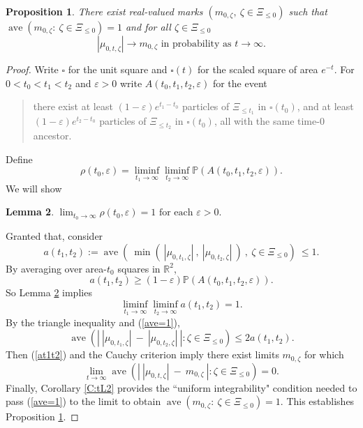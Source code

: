 \documentclass[12pt]{article}
\newtheorem{Lemma}{Lemma}
\newtheorem{Proposition}[Lemma]{Proposition}
\newcommand{\Reals}{{\mathbb{R}}}
\newcommand{\eps}{\varepsilon}
\renewcommand{\Pr}{{\mathbb P}}
\DeclareMathOperator{\ave}{ave}
\begin{document}
\begin{Proposition}
\label{P:couplenew}
There exist real-valued marks 
$(m_{0, \zeta}, \ \zeta \in \Xi_{\le 0})$ such that 
$\ave (m_{0, \zeta} : \ \zeta \in \Xi_{\le 0}) = 1$  and
for all $\zeta \in \Xi_{\le 0}$
\[ | \mu_{0,t,\zeta}| \to m_{0, \zeta} \mbox{ in probability as } t \to \infty.
\]
\end{Proposition}
\begin{proof}
Write $\square$ for the unit square and $\square(t)$ for the scaled square of area $e^{-t}$.
For $0 <t_0 <  t_1 < t_2$  and $\eps > 0$ write $A(t_0, t_1,t_2,\eps)$ for the event
\begin{quote}
there exist at least $(1 - \eps)e^{t_1-t_0}$ particles of $\Xi_{\le t_1}$ in $\square(t_0)$, and 
at least $(1 - \eps)e^{t_2-t_0}$ particles of $\Xi_{\le t_2}$ in $\square(t_0)$, 
all with the same time-$0$ ancestor.
\end{quote}
Define
\begin{equation}
 \rho(t_0, \eps) = \liminf_{t_1 \to \infty} \liminf_{t_2 \to \infty} \Pr(A(t_0,t_1,t_2,\eps)) . 
 \label{reps}
 \end{equation}
We will show
\begin{Lemma}
$\lim_{t_0 \to \infty} \rho(t_0, \eps)  = 1 
\mbox{ for each } \eps > 0 .$
\label{t00}
\end{Lemma}
Granted that, consider
\[
a(t_1,t_2) :=
 \ave( \ \min( \ | \mu_{0,t_1,\zeta}| \ , \ | \mu_{0,t_2,\zeta}|  \ ) \ , \ \zeta \in \Xi_{\le 0})  \ \le 1 .
\]
By averaging over area-$t_0$ squares in $\Reals^2$, 
\[ a(t_1,t_2) \ge (1 - \eps)  \Pr(A(t_0,t_1,t_2,\eps)) . \]
So Lemma \ref{t00} implies
\begin{equation}
\liminf_{t_1 \to \infty} \liminf_{t_2 \to \infty} a(t_1,t_2) = 1  .
\label{at1t2}
\end{equation}
By the triangle inequality and (\ref{ave=1}),
\[ \ave( \left| \ | \mu_{0,t_1,\zeta}| \ - \ | \mu_{0,t_2,\zeta}|  \  \right|  : \zeta \in \Xi_{\le 0}) 
\le 2 a(t_1,t_2) .
\]
Then (\ref{at1t2}) and the Cauchy criterion imply there exist limits $m_{0,\zeta} $ for which 
\[ \lim_{t \to \infty} \ave( \left| \ | \mu_{0,t,\zeta}| \ - \  m_{0,\zeta} \  \right|  : \zeta \in \Xi_{\le 0}) = 0 . \]
Finally, Corollary \ref{C:tL2} provides the ``uniform integrability" condition needed to pass (\ref{ave=1}) to the limit to obtain
$\ave (m_{0, \zeta} : \ \zeta \in \Xi_{\le 0}) = 1$.  
This establishes Proposition \ref{P:couplenew}.
\end{proof}
\end{document}

